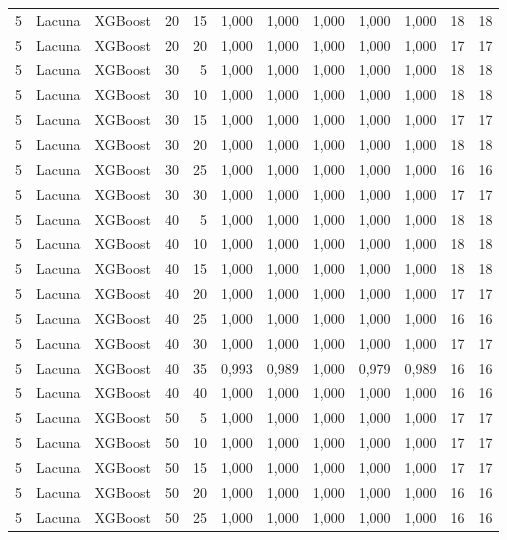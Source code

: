 \begin{longtable}{@{}rllrrrrrrrrr@{}}
5 & Lacuna & XGBoost & 20 & 15 & 1,000 & 1,000 & 1,000 & 1,000 & 1,000 & 18 & 18 \\
5 & Lacuna & XGBoost & 20 & 20 & 1,000 & 1,000 & 1,000 & 1,000 & 1,000 & 17 & 17 \\
5 & Lacuna & XGBoost & 30 & 5 & 1,000 & 1,000 & 1,000 & 1,000 & 1,000 & 18 & 18 \\
5 & Lacuna & XGBoost & 30 & 10 & 1,000 & 1,000 & 1,000 & 1,000 & 1,000 & 18 & 18 \\
5 & Lacuna & XGBoost & 30 & 15 & 1,000 & 1,000 & 1,000 & 1,000 & 1,000 & 17 & 17 \\
5 & Lacuna & XGBoost & 30 & 20 & 1,000 & 1,000 & 1,000 & 1,000 & 1,000 & 18 & 18 \\
5 & Lacuna & XGBoost & 30 & 25 & 1,000 & 1,000 & 1,000 & 1,000 & 1,000 & 16 & 16 \\
5 & Lacuna & XGBoost & 30 & 30 & 1,000 & 1,000 & 1,000 & 1,000 & 1,000 & 17 & 17 \\
5 & Lacuna & XGBoost & 40 & 5 & 1,000 & 1,000 & 1,000 & 1,000 & 1,000 & 18 & 18 \\
5 & Lacuna & XGBoost & 40 & 10 & 1,000 & 1,000 & 1,000 & 1,000 & 1,000 & 18 & 18 \\
5 & Lacuna & XGBoost & 40 & 15 & 1,000 & 1,000 & 1,000 & 1,000 & 1,000 & 18 & 18 \\
5 & Lacuna & XGBoost & 40 & 20 & 1,000 & 1,000 & 1,000 & 1,000 & 1,000 & 17 & 17 \\
5 & Lacuna & XGBoost & 40 & 25 & 1,000 & 1,000 & 1,000 & 1,000 & 1,000 & 16 & 16 \\
5 & Lacuna & XGBoost & 40 & 30 & 1,000 & 1,000 & 1,000 & 1,000 & 1,000 & 17 & 17 \\
5 & Lacuna & XGBoost & 40 & 35 & 0,993 & 0,989 & 1,000 & 0,979 & 0,989 & 16 & 16 \\
5 & Lacuna & XGBoost & 40 & 40 & 1,000 & 1,000 & 1,000 & 1,000 & 1,000 & 16 & 16 \\
5 & Lacuna & XGBoost & 50 & 5 & 1,000 & 1,000 & 1,000 & 1,000 & 1,000 & 17 & 17 \\
5 & Lacuna & XGBoost & 50 & 10 & 1,000 & 1,000 & 1,000 & 1,000 & 1,000 & 17 & 17 \\
5 & Lacuna & XGBoost & 50 & 15 & 1,000 & 1,000 & 1,000 & 1,000 & 1,000 & 17 & 17 \\
5 & Lacuna & XGBoost & 50 & 20 & 1,000 & 1,000 & 1,000 & 1,000 & 1,000 & 16 & 16 \\
5 & Lacuna & XGBoost & 50 & 25 & 1,000 & 1,000 & 1,000 & 1,000 & 1,000 & 16 & 16 \\

\end{longtable}

